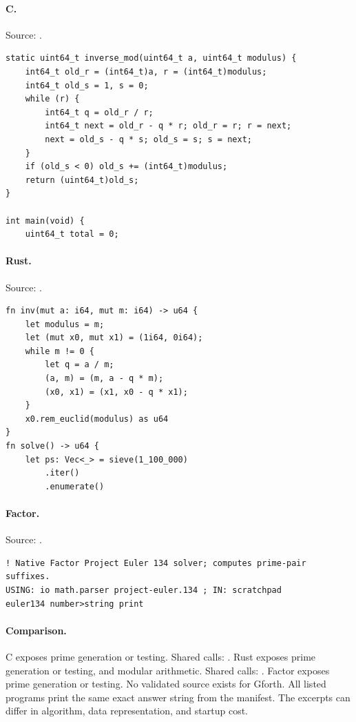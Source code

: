 \paragraph{C.} Source: .
\begin{lstlisting}
static uint64_t inverse_mod(uint64_t a, uint64_t modulus) {
    int64_t old_r = (int64_t)a, r = (int64_t)modulus;
    int64_t old_s = 1, s = 0;
    while (r) {
        int64_t q = old_r / r;
        int64_t next = old_r - q * r; old_r = r; r = next;
        next = old_s - q * s; old_s = s; s = next;
    }
    if (old_s < 0) old_s += (int64_t)modulus;
    return (uint64_t)old_s;
}

int main(void) {
    uint64_t total = 0;
\end{lstlisting}

\paragraph{Rust.} Source: .
\begin{lstlisting}
fn inv(mut a: i64, mut m: i64) -> u64 {
    let modulus = m;
    let (mut x0, mut x1) = (1i64, 0i64);
    while m != 0 {
        let q = a / m;
        (a, m) = (m, a - q * m);
        (x0, x1) = (x1, x0 - q * x1);
    }
    x0.rem_euclid(modulus) as u64
}
fn solve() -> u64 {
    let ps: Vec<_> = sieve(1_100_000)
        .iter()
        .enumerate()
\end{lstlisting}

\paragraph{Factor.} Source: .
\begin{lstlisting}
! Native Factor Project Euler 134 solver; computes prime-pair suffixes.
USING: io math.parser project-euler.134 ; IN: scratchpad
euler134 number>string print
\end{lstlisting}

\paragraph{Comparison.}
C exposes prime generation or testing. Shared calls: \texttt{}. Rust exposes prime generation or testing, and modular arithmetic. Shared calls: \texttt{}. Factor exposes prime generation or testing.
No validated source exists for Gforth.
All listed programs print the same exact answer string from the manifest. The excerpts can differ in algorithm, data representation, and startup cost.

